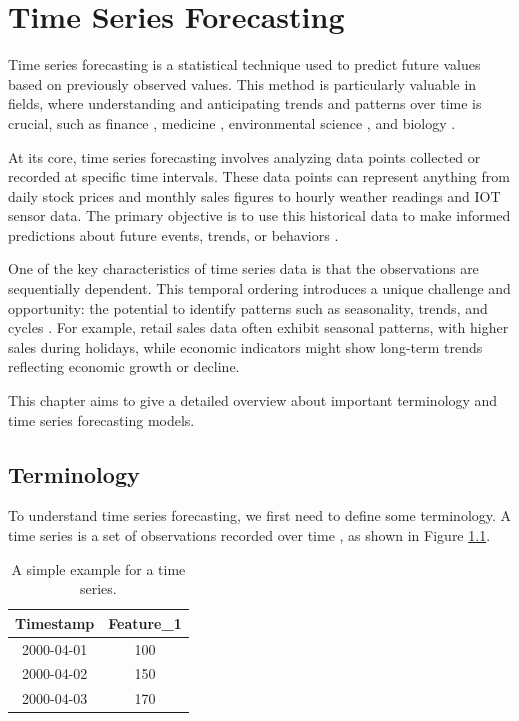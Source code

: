 \chapter{Time Series Forecasting}
\label{ch:forecasting}

Time series forecasting is a statistical technique used to predict future values based
on previously observed values. This method is particularly valuable in  fields, where
understanding and anticipating trends and patterns over time is crucial, such as
finance \parencite{andersen2005volatility}, medicine \parencite{topol2019high},
environmental science \parencite{mudelsee2019trend}, and biology \parencite{stoffer2012special}.

At its core, time series forecasting involves analyzing data points collected or
recorded at specific time intervals. These data points can represent anything from
daily stock prices and monthly sales figures to hourly weather readings and \ac{IOT}
sensor data. The primary objective is to use this historical data to make informed
predictions about future events, trends, or behaviors \parencite[ch. 1]{zhang2001investigation}.

One of the key characteristics of time series data is that the observations are
sequentially dependent. This temporal ordering introduces a unique challenge and
opportunity: the potential to identify patterns such as seasonality, trends, and
cycles \parencite{assfalg2009periodic}. For example, retail sales data often
exhibit seasonal patterns, with higher sales during holidays, while economic
indicators might show long-term trends reflecting economic growth or decline.

This chapter aims to give a detailed overview about important terminology and
time series forecasting models.

\section{Terminology}
To understand time series forecasting, we first need to define some terminology.
A time series is a set of observations recorded over time \parencite{haben2023time},
as shown in Figure \ref{tab:time_series_example}.


\begin{table}[h]
    \centering
    \begin{tabular}{|c|c|}
        \hline
        \textbf{Timestamp} & \textbf{Feature\_1} \\
        \hline
        2000-04-01         & 100                 \\
        \hline
        2000-04-02         & 150                 \\
        \hline
        2000-04-03         & 170                 \\
        \hline
    \end{tabular}
    \caption{A simple example for a time series.}
    \label{tab:time_series_example}
\end{table}

